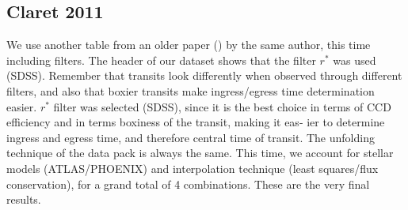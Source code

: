 \documentclass{aa}
\begin{document}
\subsection{Claret 2011}
We use another table from an older paper (\cite{claret2011}) by the same author, 
this time including filters. The header of our dataset shows that the filter $r^{*}$
was used (SDSS). Remember that transits look differently 
when observed through different filters, and also that boxier transits make 
ingress/egress time determination easier. $r^*$ filter was selected
(SDSS), since it
is the best choice in terms of CCD efficiency and
in terms boxiness of the transit, making it eas-
ier to determine ingress and egress time, and
therefore central time of transit.
The unfolding technique of the 
data pack is always the same.
This time, we account for stellar models (ATLAS/PHOENIX) and interpolation 
technique (least squares/flux conservation), for a grand total of 4 
combinations. These are the very final results.
\end{document}
